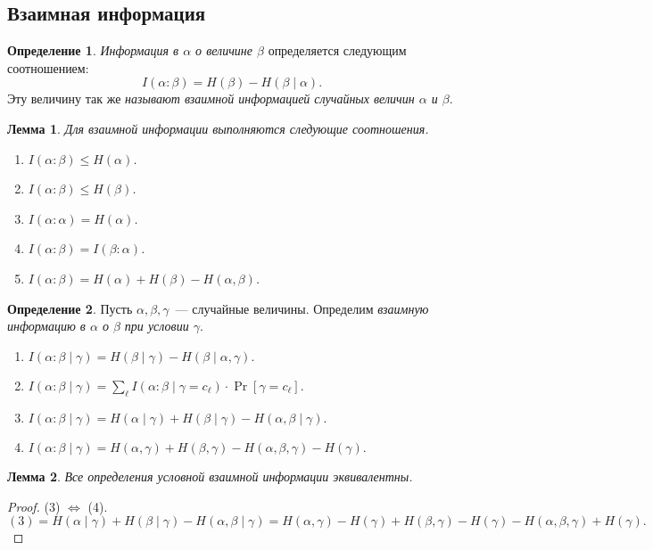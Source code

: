 \documentclass[12pt]{article}
\theoremstyle{definition}
\newtheorem{definition}{Определение}
\theoremstyle{plain}
\newtheorem{lemma}{Лемма}[section]
\theoremstyle{remark}
\begin{document}
\subsection{Взаимная информация}
\begin{definition}
\emph{Информация в \(\alpha\) о величине \(\beta\)} определяется следующим соотношением:
\[
    I(\alpha:\beta) = H(\beta) - H(\beta\mid\alpha).
\]
Эту величину так же \emph{называют взаимной информацией случайных величин \(\alpha\) и \(\beta\)}.
\end{definition}
\begin{lemma}
Для взаимной информации выполняются следующие соотношения.
\begin{enumerate}
\item \(I(\alpha:\beta) \le H(\alpha) \).
\item \(I(\alpha:\beta) \le H(\beta) \).
\item \(I(\alpha:\alpha) = H(\alpha) \).
\item \(I(\alpha:\beta) = I(\beta:\alpha) \).
\item \(I(\alpha:\beta) = H(\alpha) + H(\beta) - H(\alpha,\beta) \).
\end{enumerate}
\end{lemma}
\begin{definition}
    Пусть \(\alpha,\beta,\gamma\)~--- случайные величины. Определим
    \emph{взаимную информацию в \(\alpha\) о \(\beta\) при условии \(\gamma\)}.
    \begin{enumerate}
        \item \(I(\alpha:\beta\mid\gamma) = H(\beta\mid\gamma) -
            H(\beta\mid\alpha,\gamma).\)
        \item \(I(\alpha:\beta\mid\gamma) = \sum_\ell I(\alpha:\beta \mid
            \gamma=c_\ell)\cdot \Pr[\gamma = c_\ell].\)
        \item \(I(\alpha:\beta\mid\gamma) = H(\alpha\mid\gamma) + H(\beta\mid\gamma) -
            H(\alpha,\beta\mid\gamma).\)
        \item \(I(\alpha:\beta\mid\gamma) = H(\alpha,\gamma) + H(\beta,\gamma) -
            H(\alpha,\beta,\gamma) - H(\gamma)\).
    \end{enumerate}
\end{definition}
\begin{lemma} 
    Все определения условной взаимной информации эквивалентны.
\end{lemma}
\begin{proof}
    (3) \(\iff\) (4).
    \[
    (3) = H(\alpha\mid\gamma) + H(\beta\mid\gamma) - H(\alpha,\beta\mid\gamma) =
    H(\alpha,\gamma) - H(\gamma) + H(\beta,\gamma) - H(\gamma) -
    H(\alpha,\beta,\gamma) + H(\gamma).
    \]

\end{proof}
\end{document}
